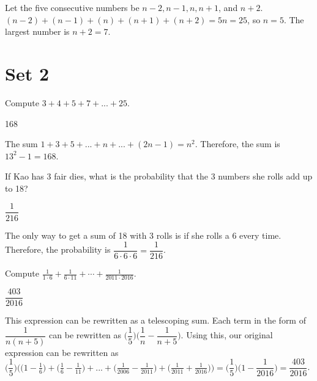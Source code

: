 \documentclass[11pt]{article}
\begin{document}
\begin{solution}
Let the five consecutive numbers be $n-2, n-1, n, n+1$, and $n+2$. $(n-2)+(n-1)+(n)+(n+1)+(n+2) = 5n = 25$, so $n=5$. The largest number is $n+2 = 7$.
\end{solution}

\newpage

\section*{Set 2}

\begin{problem}%
Compute $3+4+5+7+...+25$.
\end{problem}

\begin{answer}
168
\end{answer}

\begin{solution}
The sum $1+3+5+...+n+...+(2n-1) = n^2$. Therefore, the sum is $13^2-1 = 168$.  
\end{solution}


\begin{problem}%
If Kao has 3 fair dies, what is the probability that the 3 numbers she rolls add up to 18?
\end{problem}

\begin{answer}
$\dfrac{1}{216}$
\end{answer}

\begin{solution}
The only way to get a sum of 18 with 3 rolls is if she rolls a 6 every time. Therefore, the probability is $\dfrac{1}{6\cdot6\cdot6} = \dfrac{1}{216}$.
\end{solution}

\begin{problem}%
Compute $\frac{1}{1\cdot 6} + \frac{1}{6\cdot 11} + \cdots + \frac{1}{2011\cdot 2016}$.
\end{problem}

\begin{answer}
$\dfrac{403}{2016}$
\end{answer}

\begin{solution}
This expression can be rewritten as a telescoping sum. Each term in the form of $\dfrac{1}{n(n+5)}$ can be rewritten as $\bigg(\dfrac{1}{5}\bigg)\bigg(\dfrac{1}{n}-\dfrac{1}{n+5}\bigg)$. Using this, our original expression can be rewritten as $\bigg(\dfrac{1}{5}\bigg)\bigg(\big(1-\frac{1}{6}\big)+\big(\frac{1}{6}-\frac{1}{11}\big)+...+\big(\frac{1}{2006}-\frac{1}{2011}\big)+\big(\frac{1}{2011}+\frac{1}{2016}\big)\bigg) = \bigg(\dfrac{1}{5}\bigg)\bigg(1-\dfrac{1}{2016}\bigg) = \dfrac{403}{2016}$.
\end{solution}
\end{document}
